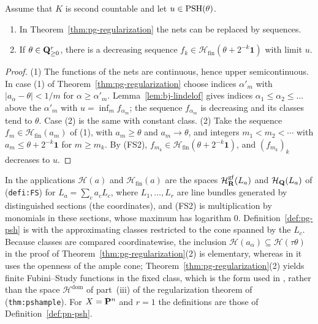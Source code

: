 \begin{corollary}\label{cor:pg-countable-regularization}
\leanok
{}
Assume that $K$ is second countable and let $u\in\operatorname{PSH}(\theta)$.
\begin{enumerate}
\item In Theorem~\ref{thm:pg-regularization} the nets can be replaced by sequences.
\item If $\theta\in\mathbf{Q}^r_{\ge0}$, there is a decreasing sequence $f_k\in\mathcal H_{\mathrm{fin}}(\theta+2^{-k}\mathbf 1)$ with limit $u$.
\end{enumerate}
\end{corollary}

\begin{proof}
(1) The functions of the nets are continuous, hence upper semicontinuous. In case (1) of Theorem~\ref{thm:pg-regularization}
choose indices $\alpha'_m$ with $|a_\alpha-\theta|<1/m$ for $\alpha\ge\alpha'_m$. Lemma~\ref{lem:bj-lindelof} gives indices
$\alpha_1\le\alpha_2\le\dots$ above the $\alpha'_m$ with $u=\inf_mf_{\alpha_m}$; the sequence $f_{\alpha_m}$ is decreasing and its
classes tend to $\theta$. Case (2) is the same with constant class. (2) Take the sequence $f_m\in\mathcal H_{\mathrm{fin}}(a_m)$ of
(1), with $a_m\ge\theta$ and $a_m\to\theta$, and integers $m_1<m_2<\cdots$ with $a_m\le\theta+2^{-k}\mathbf 1$ for $m\ge m_k$. By
(FS2), $f_{m_k}\in\mathcal H_{\mathrm{fin}}(\theta+2^{-k}\mathbf 1)$, and $(f_{m_k})_k$ decreases to $u$.
\end{proof}

\begin{remark}\label{rmk:pg-fs-system}

In the applications $\mathcal H(a)$ and $\mathcal H_{\mathrm{fin}}(a)$ are the spaces $\mathcal H^{\mathrm{gf}}_{\mathbf{R}}(L_a)$ and
$\mathcal H_{\mathbf{Q}}(L_a)$ of \cite{BJ22} (\texttt{defi:FS}) for $L_a=\sum_ca_cL_c$, where $L_1,\dots,L_r$ are line
bundles generated by distinguished sections (the coordinates), and (FS2) is multiplication by monomials in these sections,
whose maximum has logarithm $0$. Definition~\ref{def:pg-psh} is \cite[Definition~4.1]{BJ22} with the approximating classes
restricted to the cone spanned by the $L_c$. Because classes are compared coordinatewise, the inclusion
$\mathcal H(a_\alpha)\subseteq\mathcal H(\tau\theta)$ in the proof of Theorem~\ref{thm:pg-regularization}(2) is elementary, whereas in
\cite{BJ22} it uses the openness of the ample cone; Theorem~\ref{thm:pg-regularization}(2) yields finite Fubini--Study functions
in the fixed class, which is the form used in \cite[Lemma~5.10(1)]{FHX}, rather than the space $\mathcal H^{\mathrm{dom}}$ of
part~(iii) of the regularization theorem of \cite[\S4]{BJ22} (\texttt{thm:pshample}). For $X=\mathbf{P}^n$ and $r=1$ the definitions are those of
Definition~\ref{def:pn-psh}.
\end{remark}

